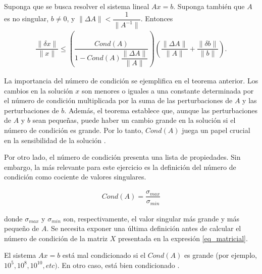 \begin{theorem} \label{teo:perturbaciones}
	Suponga que se busca resolver el sistema lineal $Ax = b$. Suponga también que $A$ es no singular, $b \neq 0$, y $\parallel \Delta A \parallel < \dfrac{1}{\parallel A^{-1} \parallel}$. 
	Entonces
	\begin{equation*}
		\begin{aligned}
			\dfrac{\parallel \delta x \parallel}{\parallel x \parallel} \leq \left (\dfrac{Cond(A)}{1 - Cond(A) \dfrac{\parallel \Delta A \parallel}{\parallel A \parallel}} \right) \left(\dfrac{\parallel \Delta A \parallel}{\parallel A \parallel} + \dfrac{\parallel \delta b \parallel}{\parallel b \parallel} \right ).
		\end{aligned}
	\end{equation*} 
\end{theorem}

La importancia del número de condición se ejemplifica en el teorema anterior. Los cambios en la solución $x$ son menores o iguales a una constante determinada por el número de condición multiplicada por la suma de las perturbaciones de $A$ y las perturbaciones de $b$. Además, el teorema establece que, aunque las perturbaciones de $A$ y $b$ sean pequeñas, puede haber un cambio grande en la solución si el número de condición es grande. Por lo tanto, $Cond(A)$ juega un papel crucial en la sensibilidad de la solución \cite{numerical_linear_algebra}. 

Por otro lado, el número de condición presenta una lista de propiedades. Sin embargo, la más relevante para este ejercicio es la definición del número de condición como cociente de valores singulares. 

\begin{equation} \label{formula:num_cond}
	\begin{aligned}
		Cond(A) = \dfrac{\sigma_{max}}{\sigma_{min}}
	\end{aligned}
\end{equation}

\noindent donde $\sigma_{max}$ y $\sigma_{min}$ son, respectivamente, el valor singular más grande y más pequeño de $A$. Se necesita exponer una última definición antes de calcular el número de condición de la matriz $X$ presentada en la expresión \ref{eq_matricial}. 

\begin{definition} \label{def:condicionamiento}
	El sistema $Ax = b$ está mal condicionado si el $Cond(A)$ es grande (por ejemplo, $10^{5}, 10^{8}, 10^{10}, etc)$. En otro caso, está bien condicionado \cite[p.~68]{numerical_linear_algebra}.
\end{definition}

